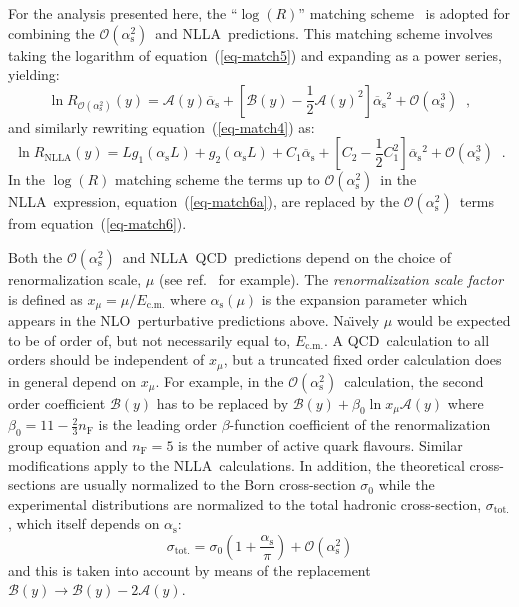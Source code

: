 \documentclass[12pt,a4paper,twoside]{article}
\newcommand{\sigtot}     {\ensuremath{\sigma_{\mathrm{tot.}}}}
\newcommand{\as}     {\ensuremath{\alpha_{\mathrm{s}}}}
\newcommand{\assq}     {\ensuremath{\alpha_{\mathrm{s}}^2}}
\newcommand{\asb}    {\ensuremath{\overline{\alpha}_{\mathrm{s}}}}
\newcommand{\asbsq}    {\ensuremath{\overline{\alpha}_{\mathrm{s}}}^2}
\newcommand{\oaa}    {\ensuremath{\mathcal{O}(\alpha_{\mathrm{s}}^2)}}
\newcommand{\oaaa}   {\ensuremath{\mathcal{O}(\alpha_{\mathrm{s}}^3)}}
\newcommand{\nf}     {\ensuremath{n_{\mathrm{F}}}}
\newcommand{\ecm}   {\ensuremath{E_{\mathrm{c.m.}}}}
\newcommand{\xmu}    {\ensuremath{x_{\mu}}}
\newcommand{\twothirds}   {\ensuremath{\frac{2}{3}}}
\newcommand{\qcd}{\mbox{QCD}}
\newcommand{\nlla}{\mbox{NLLA}}
\newcommand{\nlo}{\mbox{NLO}}
\begin{document}
For the analysis presented here, the ``$\log(R)$'' matching 
scheme~\cite{nllathmh} is adopted for combining 
the \oaa\ and \nlla\ predictions.
This matching scheme involves taking the logarithm of 
equation~(\ref{eq-match5}) and expanding as a power series, yielding:
\begin{equation}
\ln R_{\oaa}(y)= \mathcal{ A}(y) \asb + 
\left[\mathcal{ B}(y) - \frac{1}{2} \mathcal{ A}(y)^2\right] \asbsq + \oaaa \;\;,
\label{eq-match6}
\end{equation}
and similarly rewriting equation~(\ref{eq-match4}) as:
\begin{equation}
\ln R_{\mathrm{NLLA}}(y)= L g_1(\as L) + g_2(\as L)
+ C_1 \asb + [ C_2 - \frac{1}{2}  C_1^2] \asbsq + \oaaa \;\;.
\label{eq-match6a}
\end{equation}
In the $\log(R)$ matching scheme the terms up to \oaa\ 
in the \nlla\ expression, equation~(\ref{eq-match6a}), are replaced
by the \oaa\ terms from equation~(\ref{eq-match6}).

Both the \oaa\ and \nlla\ \qcd\ predictions depend on the 
choice of renormalization scale, $\mu$ (see ref.~\cite{ESW} for example). 
The {\it renormalization scale factor}
is defined as  \mbox{$\xmu=\mu/\ecm$} where $\as(\mu)$ is the 
expansion parameter which appears 
in the \nlo\ perturbative predictions above.
Na\"{\i}vely $\mu$ would be expected to be of order of, 
but not necessarily equal to, \ecm. 
A \qcd\ calculation to all orders
should be independent of $\xmu$, but a truncated fixed order calculation 
does in general depend on $\xmu$.  For example, in the \oaa\ 
calculation, the second order coefficient $\mathcal{B}(y)$
has to be replaced by 
$\mathcal{B}(y)+\beta_0\ln\xmu\mathcal{A}(y)$ where 
$\beta_0=11-\twothirds\nf$ 
is the leading order $\beta$-function coefficient of the 
renormalization group equation and $\nf=5$ is the number of 
active quark flavours.  Similar modifications apply to the 
\nlla\ calculations.   In addition, the 
theoretical cross-sections are usually 
normalized to the Born cross-section $\sigma_0$ while the
experimental distributions are normalized to
the total hadronic cross-section, $\sigtot$, which itself depends 
on $\as$:
\begin{equation}
 \sigtot=\sigma_0\left(1+\frac{\as}{\pi}\right)+\mathcal{O}(\assq)
\end{equation}
and this is taken into account
by means of the replacement $\mathcal{B}(y)\rightarrow\mathcal{B}(y)-2\mathcal{A}(y)$.
\end{document}
